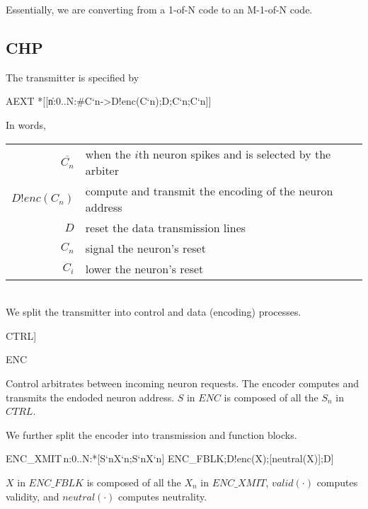 \documentclass[aer.tex]{subfiles}
\begin{document}

Essentially, we are converting from a 1-of-N code to an M-1-of-N code.

\subsection{CHP}
The transmitter is specified by

\begin{csp}
AEXT\equiv
  *[[\langle\|n:0..N:#{C`n}->D!enc(C`n);D;C`n;C`n\rangle]]
\end{csp}

\noindent In words,

\begin{tabular}[]{rl}
  $\overline{C_n}$ & when the $i$th neuron spikes and is selected by the arbiter \\
  $D!enc(C_n)$ & compute and transmit the encoding of the neuron address \\
  $D$ & reset the data transmission lines \\
  $C_n$ & signal the neuron's reset \\
  $C_i$ & lower the neuron's reset \\
\end{tabular} \\

We split the transmitter into control and data (encoding) processes. 

\begin{csp}
CTRL\equiv*[[\langle\|n:0..N\-1:#{C`n}->S`n;S`n;C`n;C`n\rangle]]
\end{csp}

\begin{csp}
ENC
\end{csp}

\noindent Control arbitrates between incoming neuron requests. The encoder computes and transmits the endoded neuron address. $S$ in $ENC$ is composed of all the $S_n$ in $CTRL$.

We further split the encoder into transmission and function blocks.

\begin{csp}
ENC_XMIT\equiv\langle\pll\,n:0..N:*[S`n\star\!X`n;S`n\star\!X`n]\rangle
ENC_FBLK\equiv*[[valid(X)];D!enc(X);[neutral(X)];D]
\end{csp}

\noindent $X$ in $ENC\_FBLK$ is composed of all the $X_n$ in $ENC\_XMIT$, $valid(\cdot)$ computes validity, and $neutral(\cdot)$ computes neutrality.
\end{document}

